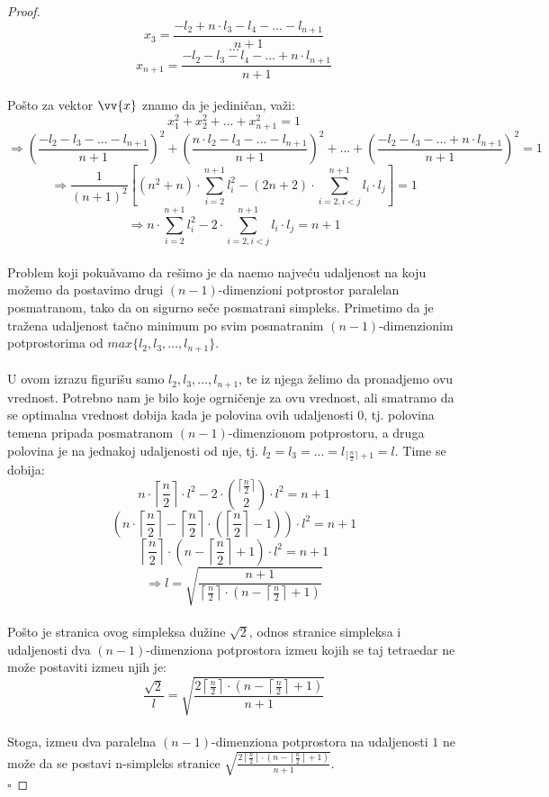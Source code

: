 \documentclass[11pt,letter]{article}
\begin{document}
\begin{proof}
$$x_3=\frac{-l_2+n\cdot l_3-l_4-...-l_{n+1}}{n+1}$$
$$...$$
$$x_{n+1}=\frac{-l_2-l_3-l_4-...+n\cdot l_{n+1}}{n+1}$$
\\
\indent Po\v sto za vektor $\vv{x}$ znamo da je jedini\v can, va\v zi:
$$x_1^2+ x_2^2+...+x_{n+1}^2=1$$
$$\Rightarrow \left(\frac{-l_2-l_3-...-l_{n+1}}{n+1}\right)^2+\left(\frac{n\cdot l_2-l_3-...-l_{n+1}}{n+1}\right)^2+...+\left(\frac{-l_2-l_3-...+n\cdot l_{n+1}}{n+1}\right)^2=1$$
$$\Rightarrow \frac{1}{(n+1)^2}\left[ (n^2+n)\cdot {\sum_{i=2}^{n+1} {l_i^2}} - (2n+2)\cdot {\sum_{i=2, i<j}^{n+1} {l_i\cdot l_j} } \right]=1$$
$$\Rightarrow n\cdot {\sum_{i=2}^{n+1} {l_i^2}} - 2\cdot {\sum_{i=2,  i<j}^{n+1} {l_i\cdot l_j} } =n+1$$
\\
\indent Problem koji poku\v avamo da re\v simo je da na\dj emo najve\' cu udaljenost na koju mo\v zemo da postavimo drugi $(n-1)$-dimenzioni potprostor paralelan posmatranom, tako da on sigurno se\v ce posmatrani simpleks. Primetimo da je tra\v zena udaljenost ta\v cno minimum po svim posmatranim $(n-1)$-dimenzionim potprostorima od $max\{l_2, l_3,..., l_{n+1}\}$.
\\
\\
\indent U ovom izrazu figuri\v su samo $l_2, l_3,..., l_{n+1}$, te iz njega \v zelimo da pronadjemo ovu vrednost. Potrebno nam je bilo koje ogrni\v cenje za ovu vrednost, ali smatramo da se optimalna vrednost dobija kada je polovina ovih udaljenosti 0, tj. polovina temena pripada posmatranom $(n-1)$-dimenzionom potprostoru, a druga polovina je na jednakoj udaljenosti od nje, tj. $l_2=l_3=...=l_{\lceil \frac{n}{2}\rceil+1}=l$. Time se dobija:
$$n\cdot \left \lceil{\frac{n}{2}}\right \rceil\cdot l^2-2\cdot {{\lceil{\frac{n}{2}}\rceil}\choose {2}}\cdot l^2=n+1$$
$$\left( n\cdot \left \lceil \frac{n}{2} \right \rceil - {\left \lceil \frac{n}{2} \right\rceil} \cdot \left( \left \lceil \frac{n}{2}\right \rceil -1 \right) \right) \cdot l^2=n+1$$
$$\left \lceil \frac{n}{2} \right \rceil \cdot \left( n-\left \lceil \frac{n}{2}\right \rceil +1 \right)\cdot l^2=n+1$$
$$\Rightarrow l=\sqrt{\frac{n+1}{\left\lceil \frac{n}{2}\right\rceil \cdot \left( n-\left\lceil \frac{n}{2}\right\rceil+1\right)}}$$
\\
Po\v sto je stranica ovog simpleksa du\v zine $\sqrt2$, odnos stranice simpleksa i udaljenosti dva $(n-1)$-dimenziona potprostora izme\dj u  kojih se taj tetraedar ne mo\v ze postaviti izme\dj u njih je:
$$\frac{\sqrt2}{l}=\sqrt{\frac{2\left\lceil \frac{n}{2}\right\rceil\cdot \left( n-\left\lceil\frac{n}{2}\right\rceil+1\right)}{n+1}}$$
\\
Stoga, izme\dj u dva paralelna $(n-1)$-dimenziona potprostora na udaljenosti $1$ ne mo\v ze da se postavi n-simpleks stranice  $\sqrt{\frac{2\left\lceil \frac{n}{2}\right\rceil\cdot \left( n-\left\lceil\frac{n}{2}\right\rceil+1\right)}{n+1}}$.
\\
$\square$
\end{proof}
\\
\end{document}
